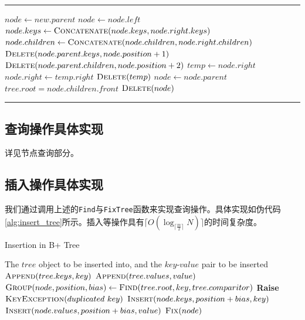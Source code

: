 \documentclass[UTF8]{ctexrep} %
\makeatletter
\newenvironment{breakablealgorithm}
  {%
   \begin{center}
     \refstepcounter{algorithm}%
     \hrule height.8pt depth0pt \kern2pt%
     \renewcommand{\caption}[2][\relax]{%
       {\raggedright\textbf{\ALG@name~\thealgorithm} ##2\par}%
       \ifx\relax##1\relax %
         \addcontentsline{loa}{algorithm}{\protect\numberline{\thealgorithm}##2}%
       \else %
         \addcontentsline{loa}{algorithm}{\protect\numberline{\thealgorithm}##1}%
       \fi
       \kern2pt\hrule\kern2pt
     }
  }{%
     \kern2pt\hrule\relax%
   \end{center}
  }
\makeatother
\begin{document}
\begin{breakablealgorithm}
\begin{algorithmic}[1]
                    \EndIf
                    \State $node \leftarrow new.parent$ 
                \Else {}
                     
                        \State $node \leftarrow node.left$
                    \EndIf
                    \State $node.keys \leftarrow \Call{Concatenate}{node.keys, node.right.keys}$
                    \State $node.children \leftarrow \Call{Concatenate}{node.children, node.right.children}$
                    \State $\Call{Delete}{node.parent.keys, node.position + 1}$
                    \State $\Call{Delete}{node.parent.children, node.position + 2}$
                    \State $temp \leftarrow node.right$
                    \State $node.right \leftarrow temp.right$
                    \State $\Call{Delete}{temp}$
                    \State $node \leftarrow node.parent$ 
                        \State $tree.root = node.children.front$
                        \State $\Call{Delete}{node}$
                    \EndIf
                \EndIf
            \EndWhile
        \EndFunction
    \end{algorithmic}
\end{breakablealgorithm}


\subsection{查询操作具体实现}
详见节点查询部分。
\subsection{插入操作具体实现}
我们通过调用上述的\texttt{Find}与\texttt{FixTree}函数来实现查询操作。具体实现如伪代码\ref{alg:insert_tree}所示。插入等操作具有$\lceil O(\log_{\lceil \frac{m}{2} \rceil}N) \rceil$的时间复杂度。

\begin{algorithm}[H]
    \caption{Insertion in B+ Tree}
    \label{alg:insert_tree}
    \begin{algorithmic}[1]
        \Require The $tree$ object to be inserted into, and the $key$-$value$ pair to be inserted
                \State $\Call{Append}{tree.keys, key}$
                \State $\Call{Append}{tree.values, value}$
                \State \Return
            \EndIf
            \State $\Call{Group}{node, position, bias} \leftarrow \Call{Find}{tree.root, key, tree.comparitor}$
                \State \textbf{Raise} $\Call{KeyException}{duplicated\ key}$
            \EndIf
            \State $\Call{Insert}{node.keys, position+bias, key}$
            \State $\Call{Insert}{node.values, position+bias, value}$
            \State $\Call{Fix}{node}$
            \State \Return
        \EndFunction
    \end{algorithmic}
\end{algorithm}
\end{document}
